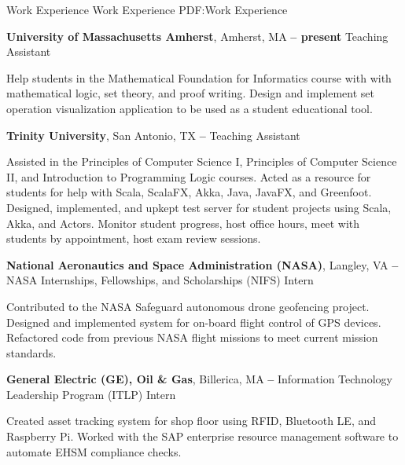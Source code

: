 \Section
{Work Experience}
{Work Experience}
{PDF:Work Experience}

\Entry
\textbf{University of Massachusetts Amherst},
Amherst, MA
\dotfill
\textbf{ -- present}
\SubEntry
\Gap
Teaching Assistant
\begin{Detail}
    \SubBulletItem
    Help students in the Mathematical Foundation for Informatics course with with mathematical logic, set theory, and proof writing.
    \SubBulletItem
    Design and implement set operation visualization application to be used as a student educational tool.
\end{Detail}

\BigGap
\Entry
\textbf{Trinity University},
San Antonio, TX
\dotfill
\textbf{ -- }
\SubEntry
\Gap
Teaching Assistant
\begin{Detail}
    \SubBulletItem
    Assisted in the Principles of Computer Science I, Principles of Computer Science II, and Introduction to Programming Logic courses.
    \SubBulletItem
    Acted as a resource for students for help with Scala, ScalaFX, Akka, Java, JavaFX, and Greenfoot.
    \SubBulletItem
    Designed, implemented, and upkept test server for student projects using Scala, Akka, and Actors.
    \SubBulletItem
    Monitor student progress, host office hours, meet with students by appointment, host exam review sessions.
\end{Detail}

\BigGap
\Entry
\textbf{National Aeronautics and Space Administration (NASA)},
Langley, VA
\dotfill
\textbf{ -- }
\SubEntry
\Gap
NASA Internships, Fellowships, and Scholarships (NIFS) Intern
\begin{Detail}
    \SubBulletItem
    Contributed to the NASA Safeguard autonomous drone geofencing project.
    \SubBulletItem
    Designed and implemented system for on-board flight control of GPS devices.
    \SubBulletItem
    Refactored code from previous NASA flight missions to meet current mission standards.
\end{Detail}

\Entry
\BigGap
\textbf{General Electric (GE), Oil \& Gas},
Billerica, MA
\dotfill
\textbf{ --
}
\SubEntry
\Gap
Information Technology Leadership Program (ITLP) Intern
\begin{Detail}
    \SubBulletItem
    Created asset tracking system for shop floor using RFID, Bluetooth LE, and Raspberry Pi.
    \SubBulletItem
    Worked with the SAP enterprise resource management software to automate EHSM compliance checks.
\end{Detail}
